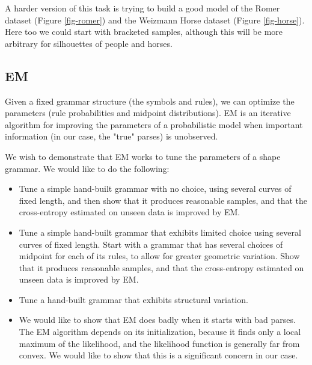 A harder version of this task is trying to build a good model of the
Romer dataset (Figure \ref{fig-romer}) and the Weizmann Horse dataset
(Figure \ref{fig-horse}). Here too we could start with bracketed
samples, although this will be more arbitrary for silhouettes of
people and horses.

\subsection{EM}
Given a fixed grammar structure (the symbols and rules), we can
optimize the parameters (rule probabilities and midpoint
distributions). EM is an iterative algorithm for improving the
parameters of a probabilistic model when important information (in our
case, the "true" parses) is unobserved.

We wish to demonstrate that EM works to tune the parameters of a shape
grammar. We would like to do the following:
\begin{itemize}
\item Tune a simple hand-built grammar with no choice, using several
  curves of fixed length, and then show that it produces reasonable
  samples, and that the cross-entropy estimated on unseen data is
  improved by EM.

\item Tune a simple hand-built grammar that exhibits limited choice
  using several curves of fixed length. Start with a grammar that has
  several choices of midpoint for each of its rules, to allow for
  greater geometric variation. Show that it produces reasonable
  samples, and that the cross-entropy estimated on unseen data is
  improved by EM.

  \item Tune a hand-built grammar that exhibits structural variation.

  \item We would like to show that EM does badly when it starts with bad
  parses. The EM algorithm depends on its initialization, because it
  finds only a local maximum of the likelihood, and the likelihood
  function is generally far from convex. We would like to show that
  this is a significant concern in our case.
\end{itemize}
